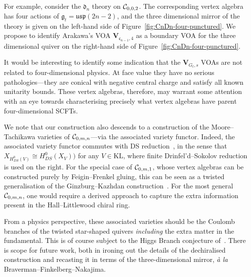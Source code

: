 \documentclass[a4paper]{article}
\def\CC{{\cal C}}
\def\df{\mathfrak{d}}
\def\gf{\mathfrak{g}}
\def \KL{\mathrm{KL}}
\def\V{\mathbf{V}}
\begin{document}
For example, consider the $\df_n$ theory on $\CC_{0,0,2}$. The corresponding vertex algebra has four actions of $\gf_t=\mathfrak{usp}(2n-2)$, and the three dimensional mirror of the theory is given on the left-hand side of Figure~\ref{fig:CnDn-four-punctured}. We propose to identify Arakawa's VOA $\V_{{\mathfrak c}_{n-1},4}$ as a boundary VOA for the three dimensional quiver on the right-hand side of Figure~\ref{fig:CnDn-four-punctured}.

It would be interesting to identify some indication that the $\V_{G_t,s}$ VOAs are not related to four-dimensional physics. At face value they have no serious pathologies---they are conical with negative central charge and satisfy all known unitarity bounds. These vertex algebras, therefore, may warrant some attention with an eye towards characterising precisely what vertex algebras have parent four-dimensional SCFTs.

We note that our construction also descends to a construction of the Moore--Tachikawa varieties of $\CC_{0,m,n}$---via the associated variety functor. Indeed, the associated variety functor commutes with DS reduction~\cite{Arakawa:2015ro}, in the sense that $X_{H^0_{DS}(V)} \cong H^0_{DS}(X_V))$ for any $V\in\KL$, where finite Drinfel'd--Sokolov reduction is used on the right. For the special case of $\CC_{0,m,1}$, whose vertex algebras can be constructed purely by Feigin--Frenkel gluing, this can be seen as a twisted generalisation of the Ginzburg--Kazhdan construction~\cite{Ginzburg:2018}. For the most general $\CC_{0,m,n}$, one would require a derived approach to capture the extra information present in the Hall--Littlewood chiral ring.

From a physics perspective, these associated varieties should be the Coulomb branches of the twisted star-shaped quivers \textit{including} the extra matter in the fundamental. This is of course subject to the Higgs Branch conjecture of~\cite{Beem:2017ooy}. There is scope for future work, both in ironing out the details of the dechiralised construction and recasting it in terms of the three-dimensional mirror, \textit{\`a la} Braverman--Finkelberg--Nakajima.
\end{document}
